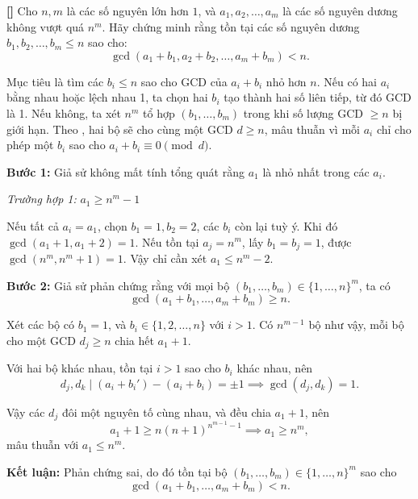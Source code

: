 \documentclass[../01-divisibility.tex]{subfiles}
\begin{document}
\begin{example*}\label{example:EGMO-2015-P3}\textbf{[]}
	Cho \( n, m \) là các số nguyên lớn hơn \( 1 \), và \( a_1, a_2, \dots, a_m \) là các số nguyên dương không vượt quá \( n^m \).
	Hãy chứng minh rằng tồn tại các số nguyên dương \( b_1, b_2, \dots, b_m \leq n \) sao cho:
	\[
		\gcd(a_1 + b_1, a_2 + b_2, \dots, a_m + b_m) < n.
	\]
\end{example*}

\begin{story*}
	Mục tiêu là tìm các \( b_i \leq n \) sao cho GCD của \( a_i + b_i \) nhỏ hơn \( n \).  
	Nếu có hai \( a_i \) bằng nhau hoặc lệch nhau 1, ta chọn hai \( b_i \) tạo thành hai số liên tiếp, từ đó GCD là 1.  
	Nếu không, ta xét \( n^m \) tổ hợp \( (b_1, \dots, b_m) \) trong khi số lượng GCD \( \geq n \) bị giới hạn. Theo , hai bộ sẽ cho cùng một GCD \( d \geq n \), mâu thuẫn vì mỗi \( a_i \) chỉ cho phép một \( b_i \) sao cho \( a_i + b_i \equiv 0 \pmod{d} \).
\end{story*}

\begin{soln}\footnotemark
	\textbf{Bước 1:} Giả sử không mất tính tổng quát rằng \( a_1 \) là nhỏ nhất trong các \( a_i \).

	\textit{Trường hợp 1:} \( a_1 \geq n^m - 1 \)

	Nếu tất cả \( a_i = a_1 \), chọn \( b_1 = 1, b_2 = 2 \), các \( b_i \) còn lại tuỳ ý. Khi đó \( \gcd(a_1 + 1, a_1 + 2) = 1 \).  
	Nếu tồn tại \( a_j = n^m \), lấy \( b_1 = b_j = 1 \), được \( \gcd(n^m, n^m + 1) = 1 \).  
	Vậy chỉ cần xét \( a_1 \leq n^m - 2 \).

	\textbf{Bước 2:} Giả sử phản chứng rằng với mọi bộ \( (b_1, \dots, b_m) \in \{1, \dots, n\}^m \), ta có
	\[
		\gcd(a_1 + b_1, \dots, a_m + b_m) \geq n.
	\]

	Xét các bộ có \( b_1 = 1 \), và \( b_i \in \{1, 2, \dots, n\} \) với \( i > 1 \). Có \( n^{m-1} \) bộ như vậy, mỗi bộ cho một GCD \( d_j \geq n \) chia hết \( a_1 + 1 \).

	Với hai bộ khác nhau, tồn tại \( i > 1 \) sao cho \( b_i \) khác nhau, nên
	\[
		d_j, d_k \mid (a_i + b_i') - (a_i + b_i) = \pm 1 \implies \gcd(d_j, d_k) = 1.
	\]

	Vậy các \( d_j \) đôi một nguyên tố cùng nhau, và đều chia \( a_1 + 1 \), nên
	\[
		a_1 + 1 \geq n(n+1)^{n^{m-1} - 1} \implies a_1 \geq n^m,
	\]
	mâu thuẫn với \( a_1 \leq n^m \).

	\textbf{Kết luận:} Phản chứng sai, do đó tồn tại bộ \( (b_1, \dots, b_m) \in \{1, \dots, n\}^m \) sao cho
	\[
		\gcd(a_1 + b_1, \dots, a_m + b_m) < n.
	\]
\end{soln}
\end{document}
